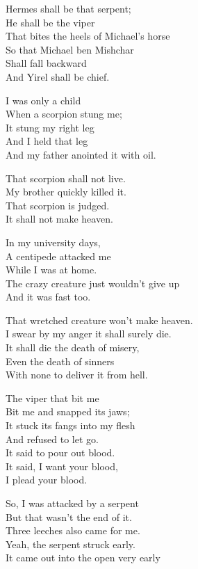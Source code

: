 \documentclass[
]{book}
\begin{document}
Hermes shall be that serpent;\\
He shall be the viper\\
That bites the heels of Michael's horse\\
So that Michael ben Mishchar\\
Shall fall backward\\
And Yirel shall be chief.

I was only a child\\
When a scorpion stung me;\\
It stung my right leg\\
And I held that leg\\
And my father anointed it with oil.

That scorpion shall not live.\\
My brother quickly killed it.\\
That scorpion is judged.\\
It shall not make heaven.

In my university days,\\
A centipede attacked me\\
While I was at home.\\
The crazy creature just wouldn't give up\\
And it was fast too.

That wretched creature won't make heaven.\\
I swear by my anger it shall surely die.\\
It shall die the death of misery,\\
Even the death of sinners\\
With none to deliver it from hell.

The viper that bit me\\
Bit me and snapped its jaws;\\
It stuck its fangs into my flesh\\
And refused to let go.\\
It said to pour out blood.\\
It said, I want your blood,\\
I plead your blood.

So, I was attacked by a serpent\\
But that wasn't the end of it.\\
Three leeches also came for me.\\
Yeah, the serpent struck early.\\
It came out into the open very early
\end{document}
